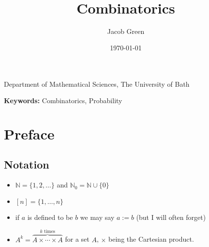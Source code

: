 \documentclass{article}
\title{Combinatorics}
\author{Jacob Green}
\date{\today}
\newcommand{\subtitle}{}
\newcommand{\institution}{Department of Mathematical Sciences, The University of Bath}
\newcommand{\keywords}{Combinatorics, Probability}
\begin{document}
\begin{titlepage}
    \centering
    
    {\Huge \bfseries \thetitle \par}
    \vspace{0.5cm}
    
    {\Large \subtitle \par}
    \vspace{1cm}
    
    {\large \theauthor \par}
    {\institution \par}
    \vspace{1cm}
    
    {\large \thedate \par}
    \vspace{1.5cm}
    
    \begin{abstract}
        \lipsum[10]
    \end{abstract}
    \vspace{1cm}
    
    \textbf{Keywords:} \keywords
    \vfill %
    
    \textit{}
\end{titlepage}

\newpage 

\setcounter{page}{1} %

\section*{Preface}

\subsection*{Notation}

\begin{itemize}
    \item $\mathbb{N} = \{1, 2, \dots\}$ and $\mathbb{N}_0 = \mathbb{N} \cup \{0\}$
    \item $[n] = \{1, \dots, n\}$
    \item if $a$ is defined to be $b$ we may say $a := b$ (but I will often forget)
    \item $A^k = \overbrace{A \times \cdots \times A}^{k \text{ times}}$ for a set $A$, $\times$ being the Cartesian product. 
\end{itemize}
\end{document}
